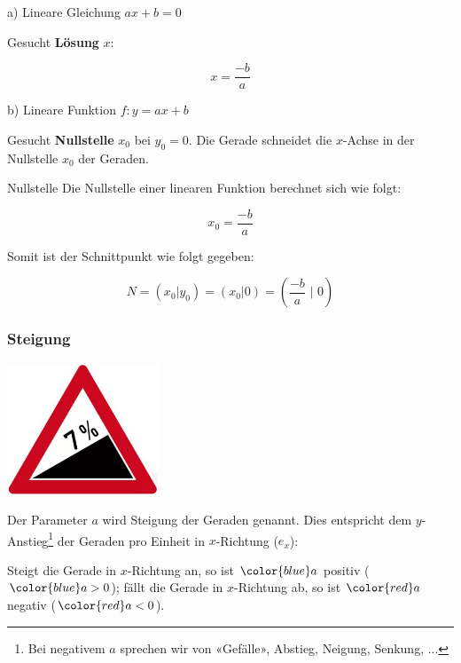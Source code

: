 a) Lineare Gleichung $ax+b=0$

Gesucht \textbf{Lösung} $x$:

$$x = \frac{-b}{a}  $$

b) Lineare Funktion $f: y=ax+b$

Gesucht \textbf{Nullstelle} $x_0$ bei $y_0=0$. Die Gerade schneidet
die $x$-Achse in der Nullstelle $x_0$ der Geraden.

\begin{gesetz}{Nullstelle}{}
  Die Nullstelle einer linearen Funktion berechnet sich wie folgt:
  
$$x_0 = \frac{-b}{a}$$
\end{gesetz}

Somit ist der
Schnittpunkt wie folgt gegeben:

$$N = (x_0|y_0) = (x_0|0) =\left( \frac{-b}{a}\,\, \bigg|\,\, 0 \right) $$



\newpage


\subsubsection{Steigung}
  \includegraphics[width=4.5cm]{tals/trig1/img/starkeSteigung.jpg}

Der Parameter $a$ wird Steigung der Geraden genannt. Dies entspricht
dem $y$-Anstieg\footnote{Bei negativem $a$ sprechen wir von «Gefälle»,
  Abstieg, Neigung, Senkung, ...} der Geraden pro Einheit in $x$-Richtung ($e_x$):



\newpage


Steigt die Gerade in $x$-Richtung an, so ist ${\color{blue}a}$ positiv (${\color{blue}a>0}$);
fällt die Gerade in $x$-Richtung ab, so ist ${\color{red}a}$ negativ (${\color{red}a<0}$).

